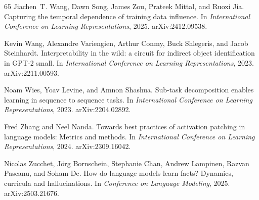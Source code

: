 \begin{thebibliography}{65}
Jiachen~T. Wang, Dawn Song, James Zou, Prateek Mittal, and Ruoxi Jia.
\newblock Capturing the temporal dependence of training data influence.
\newblock In \emph{International Conference on Learning Representations}, 2025.
\newblock arXiv:2412.09538.

Kevin Wang, Alexandre Variengien, Arthur Conmy, Buck Shlegeris, and Jacob Steinhardt.
\newblock Interpretability in the wild: a circuit for indirect object identification in GPT-2 small.
\newblock In \emph{International Conference on Learning Representations}, 2023.
\newblock arXiv:2211.00593.

Noam Wies, Yoav Levine, and Amnon Shashua.
\newblock Sub-task decomposition enables learning in sequence to sequence tasks.
\newblock In \emph{International Conference on Learning Representations}, 2023.
\newblock arXiv:2204.02892.

Fred Zhang and Neel Nanda.
\newblock Towards best practices of activation patching in language models: Metrics and methods.
\newblock In \emph{International Conference on Learning Representations}, 2024.
\newblock arXiv:2309.16042.

Nicolas Zucchet, J{\"o}rg Bornschein, Stephanie Chan, Andrew Lampinen, Razvan Pascanu, and Soham De.
\newblock How do language models learn facts? Dynamics, curricula and hallucinations.
\newblock In \emph{Conference on Language Modeling}, 2025.
\newblock arXiv:2503.21676.

\end{thebibliography}
